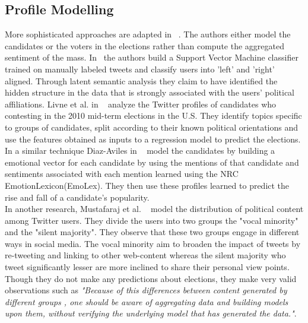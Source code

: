 \subsection{Profile Modelling}
More sophisticated approaches are adapted in ~\cite{livne2011party,conover2011predicting,diaz2012taking}. 
The authors either model the candidates or the voters in the elections rather than compute the aggregated sentiment of the mass.  
In~\cite{conover2011predicting} the authors build a Support Vector Machine classifier trained on manually labeled tweets and classify users into 'left' and 'right' aligned.
Through latent semantic analysis they claim to have identified the hidden structure in the data that is strongly associated with the users' political affiliations.
Livne et al. in ~\cite{livne2011party} analyze the Twitter profiles of candidates who contesting in the 2010 mid-term elections in the U.S. 
They identify topics specific to groups of candidates, split according to their known political orientations and use the features obtained as inputs to a regression model to predict the elections. 
In a similar technique Diaz-Aviles in ~\cite{diaz2012taking} model the candidates by building a emotional vector for each candidate by using the mentions of that candidate and sentiments associated with each mention learned using the NRC EmotionLexicon(EmoLex). 
They then use these profiles learned to predict the rise and fall of a candidate's popularity. \\
In another research, Mustafaraj et al. ~\cite{mustafaraj2011vocal} model the distribution of political content among Twitter users. 
They divide the users into two groups the "vocal minority" and the "silent majority". 
They observe that these two groups engage in different ways in social media.
The vocal minority aim to broaden the impact of tweets by re-tweeting and linking to other web-content whereas the silent majority who tweet significantly lesser are more inclined to share their personal view points.
Though they do not make any predictions about elections, they make very valid observations such as 
\emph{"Because of this differences between content generated by different groups , one should be aware of aggregating data and building models upon them, without verifying the underlying model that has generated the data."}.
